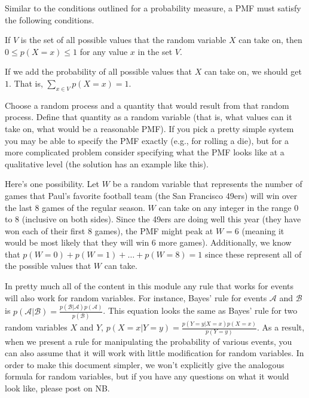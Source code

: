 \documentclass[review_Solutions]{subfiles}
\begin{document}
\noindent Similar to the conditions outlined for a probability measure, a PMF must satisfy the following conditions.
\be
\item If $V$ is the set of all possible values that the random variable $X$ can take on, then $0 \leq p(X = x) \leq 1$ for any value $x$ in the set $V$.
\item If we add the probability of all possible values that $X$ can take on, we should get $1$.  That is, $\sum_{x \in V} p(X = x) = 1$.
\ee

\ei

\begin{exercise}
Choose a random process and a quantity that would result from that random process.  Define that quantity as a random variable (that is, what values can it take on, what would be a reasonable PMF).  If you pick a pretty simple system you may be able to specify the PMF exactly (e.g., for rolling a die), but for a more complicated problem consider specifying what the PMF looks like at a qualitative level (the solution has an example like this).
\begin{boxedsolution}
Here's one possibility.  Let $W$ be a random variable that represents the number of games that Paul's favorite football team (the San Francisco 49ers) will win over the last 8 games of the regular season.  $W$ can take on any integer in the range $0$ to $8$ (inclusive on both sides).  Since the 49ers are doing well this year (they have won each of their first 8 games), the PMF might peak at $W=6$ (meaning it would be most likely that they will win 6 more games).   Additionally, we know that $p(W=0) + p(W=1) + \ldots + p(W=8) = 1$ since these represent all of the possible values that $W$ can take.
\end{boxedsolution}
\end{exercise}

\begin{notice}
In pretty much all of the content in this module any rule that works for events will also work for random variables.  For instance, Bayes' rule for events $\mathcal{A}$ and $\mathcal{B}$ is $p(\mathcal{A} | \mathcal{B}) = \frac{p(\mathcal{B}|\mathcal{A}) p(\mathcal{A})}{p(\mathcal{B})}$.  This equation looks the same as Bayes' rule for two random variables $X$ and $Y$, $p(X=x | Y=y) = \frac{p(Y=y|X=x) p(X=x)}{p(Y=y)}$.  As a result, when we present a rule for manipulating the probability of various events, you can also assume that it will work with little modification for random variables.  In order to make this document simpler, we won't explicitly give the analogous formula for random variables, but if you have any questions on what it would look like, please post on NB.
\end{notice}
\end{document}
